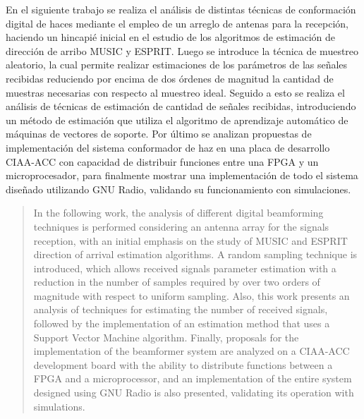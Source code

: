 \begin{resumen}%
    En el siguiente trabajo se realiza el análisis de distintas técnicas de conformación digital de haces mediante el empleo de un arreglo de antenas para la recepción, haciendo un hincapié inicial en el estudio de los algoritmos de estimación de dirección de arribo MUSIC y ESPRIT. Luego se introduce la técnica de muestreo aleatorio, la cual permite realizar estimaciones de los parámetros de las señales recibidas reduciendo por encima de dos órdenes de magnitud la cantidad de muestras necesarias con respecto al muestreo ideal. Seguido a esto se realiza el análisis de técnicas de estimación de cantidad de señales recibidas, introduciendo un método de estimación que utiliza el algoritmo de aprendizaje automático de máquinas de vectores de soporte. Por último se analizan propuestas de implementación del sistema conformador de haz en una placa de desarrollo CIAA-ACC con capacidad de distribuir funciones entre una FPGA y un microprocesador, para finalmente mostrar una implementación de todo el sistema diseñado utilizando GNU Radio, validando su funcionamiento con simulaciones.
\end{resumen}

\begin{abstract}%
    In the following work, the analysis of different digital beamforming techniques is performed considering an antenna array for the signals reception, with an initial emphasis on the study of MUSIC and ESPRIT direction of arrival estimation algorithms. A random sampling technique is introduced, which allows received signals parameter estimation with a reduction in the number of samples required by over two orders of magnitude with respect to uniform sampling. Also, this work presents an analysis of techniques for estimating the number of received signals, followed by the implementation of an estimation method that uses a Support Vector Machine algorithm. Finally, proposals for the implementation of the beamformer system are analyzed on a CIAA-ACC development board with the ability to distribute functions between a FPGA and a microprocessor, and an implementation of the entire system designed using GNU Radio is also presented, validating its operation with simulations.
\end{abstract}